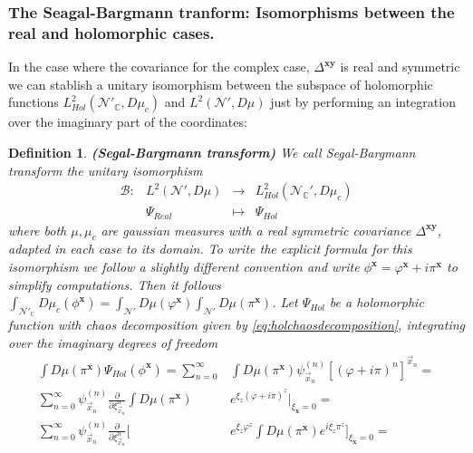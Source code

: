 \documentclass[12pt]{article}%
\newtheorem{definition}{Definition}%
\begin{document}
    \subsubsection{The Seagal-Bargmann tranform: Isomorphisms between the real and holomorphic cases.}
    In the case where the covariance for the complex case, $\Delta^{\mathbf{xy}}$ is real and symmetric we can stablish a unitary isomorphism between the subspace of holomorphic functions $L^2_{Hol}(\mathcal{N}'_{\mathbb{C}},D\mu_c)$ and  $L^2(\mathcal{N}',D\mu)$ just by performing an integration over the imaginary part of the coordinates:    


    \begin{definition}
        \label{def:Segaltranf}{\bf (Segal-Bargmann transform)} We call Segal-Bargmann transform the unitary isomorphism
        $$
        \begin{array}{cccc}
        \mathcal{B} :&  L^2(\mathcal{N}',D\mu)  & \longrightarrow &  L_{Hol}^2(\mathcal{N}_{\mathbb{C}}',D\mu_c) \\ 
         & \Psi_{Real} &\longmapsto & \Psi_{Hol}  
        \end{array}
        $$
        where both $\mu,\mu_c$ are gaussian measures with a real symmetric covariance $\Delta^{\mathbf{xy}}$, adapted in each case to its domain. To write the explicit formula for this isomorphism we follow a slightly different convention and write $\phi^\mathbf{x}=\varphi^\mathbf{x}+i\pi^\mathbf{x}$ to simplify computations. Then it follows   $\int_{\mathcal{N}'_\mathbb{C}} D\mu_c(\phi^{\mathbf{x}})=\int_{\mathcal{N}'} D\mu(\varphi^{\mathbf{x}})\int_{\mathcal{N}'} D\mu(\pi^{\mathbf{x}})$. Let $\Psi_{Hol}$ be a holomorphic function with chaos decomposition given by \eqref{eq:holchaosdecomposition}, integrating over the imaginary degrees of freedom 
    \begin{equation*}
        \label{eq:schHolrelation}
        \begin{split}
        \int D\mu(\pi^{\mathbf{x}})\Psi_{Hol}(\phi^\mathbf{x})=
        \sum_{n=0}^\infty &\int D\mu(\pi^{\mathbf{x}}) \psi^{(n)}_{\vec{x}_n}{[(\varphi+%
        i\pi)^n]^{\vec{x}_n}}=
        \\
        \sum_{n=0}^\infty  \psi^{(n)}_{\vec{x}_n}\frac{\partial}{\partial \xi^n_{\vec{x}_n}}\int D\mu(\pi^{\mathbf{x}})& e^{\xi_z(\varphi+i\pi)^z}\bigg\lvert_{\xi_{\mathbf{x}}=0}= 
        \\
        \sum_{n=0}^\infty  \psi^{(n)}_{\vec{x}_n}
        \frac{\partial}{\partial \xi^n_{\vec{x}_n}}\Bigg[&   e^{{\xi_z\varphi^z} } \int D\mu(\pi^{\mathbf{x}}) e^{i{\xi_z\pi^z}}\Bigg]_{\xi_{\mathbf{x}}=0}= 

\end{split}
\end{equation*}
\end{definition}
\end{document}
